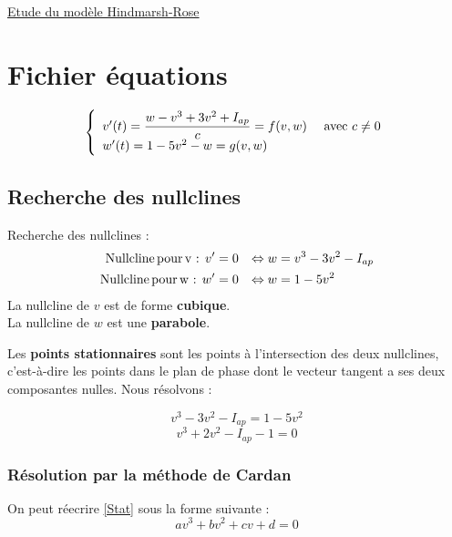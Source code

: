 \documentclass[12pt,a4paper,onecolumn]{article}
\begin{document}
\href{https://tel.archives-ouvertes.fr/tel-00453912v1/document}{Etude du  modèle Hindmarsh-Rose}


\newpage
\tableofcontents

\newpage

\section{Fichier équations}




\begin{equation}
\left\{
\begin{array}{l l}
v'(t)= \displaystyle{\frac{w - v^3 + 3v^2 +I_{ap}}{c}} = f(v,w) & \text{ avec } c\neq 0\\
w'(t) = 1 - 5 v^2 - w = g(v,w) & \\
\end{array}
\right.
\end{equation}

\subsection{Recherche des nullclines}

Recherche des nullclines :
\begin{align*}
\text{Nullcline\,pour\,v : } v' &= 0  &\Leftrightarrow w &= v^3 - 3 v^2 - I_{ap}\\
\text{Nullcline\,pour\,w : } w' &= 0 &\Leftrightarrow w &= 1-5v^2
\end{align*}
La nullcline de $v$ est de forme \textbf{cubique}. \\
La nullcline de $w$ est une \textbf{parabole}.

Les \textbf{points stationnaires} sont les points à l'intersection des deux nullclines, c'est-à-dire les points dans le plan de phase dont le vecteur tangent a ses deux composantes nulles. Nous résolvons :

$$
v^3 - 3 v^2 - I_{ap} = 1-5v^2
$$
\begin{equation} \label{Stat}
v^3 + 2v^2 -I_{ap} -1 = 0
\end{equation}



\subsubsection{Résolution par la méthode de Cardan}
On peut réecrire \ref{Stat} sous la forme suivante :
\begin{equation*}
av^3 + b v^2 + cv + d = 0
\end{equation*}
\end{document}
